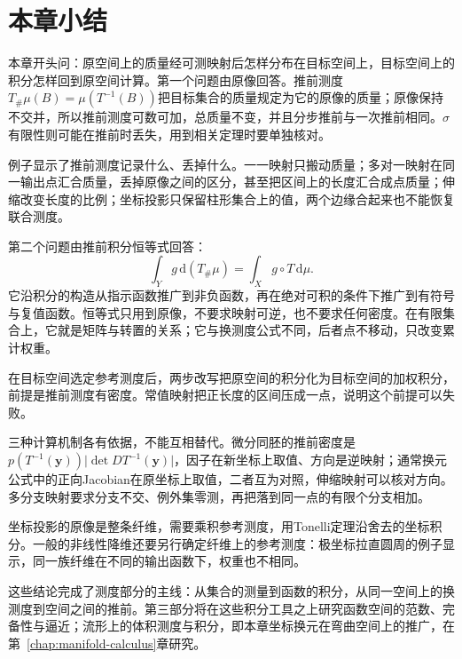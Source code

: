 \section{本章小结}
\label{sec:push-summary}

本章开头问：原空间上的质量经可测映射后怎样分布在目标空间上，目标空间上的积分怎样回到原空间计算。第一个问题由原像回答。推前测度$T_\#\mu(B)=\mu(T^{-1}(B))$把目标集合的质量规定为它的原像的质量；原像保持不交并，所以推前测度可数可加，总质量不变，并且分步推前与一次推前相同。$\sigma$有限性则可能在推前时丢失，用到相关定理时要单独核对。

例子显示了推前测度记录什么、丢掉什么。一一映射只搬动质量；多对一映射在同一输出点汇合质量，丢掉原像之间的区分，甚至把区间上的长度汇合成点质量；伸缩改变长度的比例；坐标投影只保留柱形集合上的值，两个边缘合起来也不能恢复联合测度。

第二个问题由推前积分恒等式回答：
\[
\int_Yg\,\mathrm d(T_\#\mu)=\int_Xg\circ T\,\mathrm d\mu .
\]
它沿积分的构造从指示函数推广到非负函数，再在绝对可积的条件下推广到有符号与复值函数。恒等式只用到原像，不要求映射可逆，也不要求任何密度。在有限集合上，它就是矩阵与转置的关系；它与换测度公式不同，后者点不移动，只改变累计权重。

在目标空间选定参考测度后，两步改写把原空间的积分化为目标空间的加权积分，前提是推前测度有密度。常值映射把正长度的区间压成一点，说明这个前提可以失败。

三种计算机制各有依据，不能互相替代。微分同胚的推前密度是$p(T^{-1}(\bm y))\lvert\det DT^{-1}(\bm y)\rvert$，因子在新坐标上取值、方向是逆映射；通常换元公式中的正向Jacobian在原坐标上取值，二者互为对照，伸缩映射可以核对方向。多分支映射要求分支不交、例外集零测，再把落到同一点的有限个分支相加。

坐标投影的原像是整条纤维，需要乘积参考测度，用Tonelli定理沿舍去的坐标积分。一般的非线性降维还要另行确定纤维上的参考测度：极坐标拉直圆周的例子显示，同一族纤维在不同的输出函数下，权重也不相同。

这些结论完成了测度部分的主线：从集合的测量到函数的积分，从同一空间上的换测度到空间之间的推前。第三部分将在这些积分工具之上研究函数空间的范数、完备性与逼近；流形上的体积测度与积分，即本章坐标换元在弯曲空间上的推广，在第~\ref{chap:manifold-calculus}章研究。
